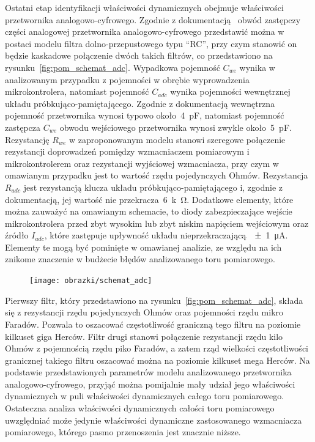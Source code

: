 Ostatni etap identyfikacji właściwości dynamicznych obejmuje właściwości przetwornika analogowo-cyfrowego. Zgodnie z dokumentacją~\cite{stm_f411} obwód zastępczy części analogowej przetwornika analogowo-cyfrowego przedstawić można w postaci modelu filtra dolno-przepustowego typu \enquote{RC}, przy czym stanowić on będzie kaskadowe połączenie dwóch takich filtrów, co przedstawiono na rysunku~\ref{fig:pom_schemat_adc}. Wypadkowa pojemność $C_{we}$ wynika w analizowanym przypadku z pojemności w obrębie wyprowadzenia mikrokontrolera, natomiast pojemność $C_{adc}$ wynika pojemności wewnętrznej układu próbkująco-pamiętającego. Zgodnie z dokumentacją wewnętrzna pojemność przetwornika wynosi typowo około~\qty{4}{pF}, natomiast pojemność zastępcza $C_{we}$ obwodu wejściowego przetwornika wynosi zwykle około~\qty{5}{pF}. Rezystancję $R_{we}$ w zaproponowanym modelu stanowi szeregowe połączenie rezystancji doprowadzeń pomiędzy wzmacniaczem pomiarowym i mikrokontrolerem oraz rezystancji wyjściowej wzmacniacza, przy czym w omawianym przypadku jest to wartość rzędu pojedynczych Ohmów. Rezystancja $R_{adc}$ jest rezystancją klucza układu próbkująco-pamiętającego i, zgodnie z dokumentacją, jej wartość nie przekracza~\qty{6}{k\ohm}. Dodatkowe elementy, które można zauważyć na omawianym schemacie, to diody zabezpieczające wejście mikrokontrolera przed zbyt wysokim lub zbyt niskim napięciem wejściowym oraz źródło $I_{adc}$, które zastępuje upływność układu nieprzekraczającą~\qty{\pm 1}{\micro A}. Elementy te mogą być pominięte w omawianej analizie, ze względu na ich znikome znaczenie w budżecie błędów analizowanego toru pomiarowego.

\begin{figure}[htb!]
\begin{center}
\texttt{[image: obrazki/schemat\_adc]}
\end{center}
\end{figure}

Pierwszy filtr, który przedstawiono na rysunku~\ref{fig:pom_schemat_adc}, składa się z rezystancji rzędu pojedynczych Ohmów oraz pojemności rzędu mikro Faradów. Pozwala to oszacować częstotliwość graniczną tego filtru na poziomie kilkuset giga Herców. Filtr drugi stanowi połączenie rezystancji rzędu kilo Ohmów z pojemnością rzędu piko Faradów, a zatem rząd wielkości częstotliwości granicznej takiego filtru oszacować można na poziomie kilkuset mega Herców. Na podstawie przedstawionych parametrów modelu analizowanego przetwornika analogowo-cyfrowego, przyjąć można pomijalnie mały udział jego właściwości dynamicznych w puli właściwości dynamicznych całego toru pomiarowego. Ostateczna analiza właściwości dynamicznych całości toru pomiarowego uwzględniać może jedynie właściwości dynamiczne zastosowanego wzmacniacza pomiarowego, którego pasmo przenoszenia jest znacznie niższe.

